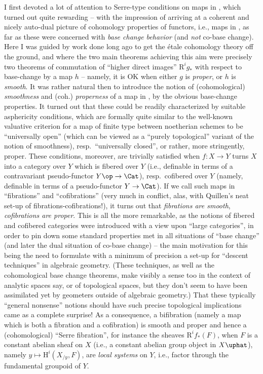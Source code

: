 I first devoted a lot of attention to Serre-type conditions on maps in
\Cat, which turned out quite rewarding -- with the impression of
arriving at a coherent and nicely auto-dual picture of cohomology
properties of functors, i.e., maps in \Cat, as far as these were
concerned with \emph{base change behavior} (and \emph{not} co-base
change). Here I was guided by work done long ago to get the étale
cohomology theory off the ground, and where the two main theorems
achieving this aim were precisely two theorems of commutation of
``higher direct images'' $\mathrm R^ig_*$ with respect to base-change
by a map $h$ -- namely, it is OK when either $g$ is \emph{proper}, or
$h$ is \emph{smooth}. It was rather natural then to introduce the
notion of (cohomological) \emph{smoothness} and (coh.)
\emph{properness} of a map in \Cat, by the obvious base-change
properties. It turned out that these could be readily characterized by
suitable asphericity conditions, which are formally quite similar to
the well-known valuative criterion for a map of finite type between
noetherian schemes to be ``universally open'' (which can be viewed as
a ``purely topological'' variant of the notion of smoothness), resp.\
``universally closed'', or rather, more stringently, proper. These
conditions, moreover, are trivially satisfied when $f: X\to Y$ turns
$X$ into a category over $Y$ which is fibered over $Y$ (i.e.,
definable in terms of a contravariant pseudo-functor $Y\op\to\Cat$),
resp.\ cofibered over $Y$ (namely, definable in terms of a
pseudo-functor $Y\to\Cat$). If we call such maps in \Cat{}
``fibrations'' and ``cofibrations'' (very much in conflict, alas, with
Quillen's neat set-up of fibrations-cofibrations!), it turns out that
\emph{fibrations are smooth}, \emph{cofibrations are proper}. This is
all the more remarkable, as the notions of fibered and cofibered
categories were introduced with a view upon ``large categories'', in
order to pin down some standard properties met in all situations of
``base change'' (and later the dual situation of co-base change) --
the main motivation for this being the need to formulate with a
minimum of precision a set-up for ``descent techniques'' in algebraic
geometry. (These techniques, as well as the cohomological base change
theorems, make visibly a sense too in the context of analytic spaces
say, or of topological spaces, but they don't seem to have been
assimilated yet by geometers outside of algebraic geometry.) That
these typically ``general nonsense'' notions should have such precise
topological implications came as a complete surprise! As a
consequence, a bifibration (namely a map which is both a fibration and
a cofibration) is smooth and proper and hence a (cohomological)
``Serre fibration'', for instance the sheaves $\mathrm R^if_*(F)$,
when $F$ is a constant abelian sheaf on $X$ (i.e., a constant abelian
group object in $X\uphat$), namely $y\mapsto\mathrm H^i(X_{/y},F)$,
are \emph{local systems} on $Y$, i.e., factor through the fundamental
groupoid of $Y$.

